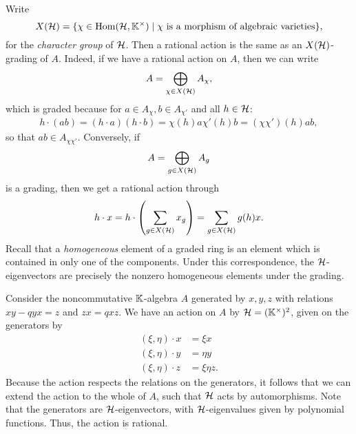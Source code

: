 Write
\begin{equation*}
	X(\mathcal{H}) = \{\chi \in \operatorname{Hom}(\mathcal{H}, \mathbb{K}^\times) \mid \chi \text{ is a morphism of algebraic varieties}\},
\end{equation*}
%
for the \emph{character group} of $\mathcal{H}$. Then a rational action
is the same as an $X(\mathcal{H})$-grading of $A$. Indeed, if we have a
rational action on $A$, then we can write
\begin{equation*}
	A = \bigoplus_{\chi \in X(\mathcal{H})} A_\chi,
\end{equation*}
which is graded because for $a \in A_\chi, b \in A_{\chi'}$ and all $h \in \mathcal{H}$:
\begin{align*}
	h \cdot (a b) = (h\cdot a)(h\cdot b)= \chi(h)a \chi'(h)b = (\chi \chi')(h)ab,
\end{align*}
so that $ab \in A_{\chi \chi'}$. Conversely, if
\begin{equation*}
	A = \bigoplus_{g \in X(\mathcal{H})} A_g
\end{equation*}
is a grading, then we get a rational action through
\begin{equation*}
	h \cdot x = h \cdot \left(\sum_{g \in X(\mathcal{H})} x_g \right) = \sum_{g \in X(\mathcal{H})} g(h)x.
\end{equation*}
%
Recall that a \emph{homogeneous} element of a graded ring is an element which is
contained in only one of the components. Under this correspondence, the
$\mathcal{H}$-eigenvectors are precisely the nonzero homogeneous
elements under the grading.

\begin{example}
	Consider the noncommutative $\mathbb{K}$-algebra $A$ generated by $x,y,z$ with relations $xy
		-qyx = z$ and $zx = qxz$. We have an action on $A$ by $\mathcal{H} = (\mathbb{K}^\times)^2$, given
	on the generators by
	\begin{align*}
		(\xi, \eta)\cdot x & = \xi x      \\
		(\xi, \eta)\cdot y & = \eta y     \\
		(\xi, \eta)\cdot z & = \xi\eta z.
	\end{align*}
	Because the action respects the relations on the generators, it follows that we can
	extend the action to the whole of $A$, such that $\mathcal{H}$ acts by automorphisms. Note
	that the generators are $\mathcal{H}$-eigenvectors, with $\mathcal{H}$-eigenvalues given by
	polynomial functions. Thus, the action is rational.

\end{example}

